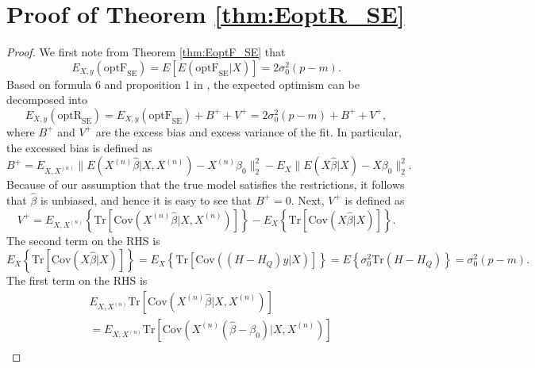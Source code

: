 \section{Proof of Theorem \ref{thm:EoptR_SE}}
\begin{proof}

We first note from Theorem \ref{thm:EoptF_SE} that
\begin{equation*}
E_{X,y}(\text{optF}_\text{SE}) = E \left[ E(\text{optF}_\text{SE} | X ) \right] = 2 \sigma_0^2(p-m).
\end{equation*}
Based on formula 6 and proposition 1 in , the expected optimism can be decomposed into 
\begin{equation*}
E_{X,y}(\text{optR}_\text{SE}) = E_{X,y}(\text{optF}_\text{SE}) + B^+ + V^+ = 2 \sigma_0^2(p-m) +  B^+ + V^+,
\end{equation*}
where $B^+$ and $V^+$ are the excess bias and excess variance of the fit. In particular, the excessed bias is defined as
\begin{equation*}
B^+ = E_{X,X^{(n)}} \big\lVert E( X^{(n)} \hat{\beta} \big | X, X^{(n)} ) - X^{(n)} \beta_0 \big\rVert_2^2 - E_X \big\lVert E( X \hat{\beta} \big | X ) - X \beta_0 \big\rVert_2^2.
\end{equation*}
Because of our assumption that the true model satisfies the restrictions, it follows that $\hat{\beta}$ is unbiased, and hence it is easy to see that $B^+=0$. Next, $V^+$ is defined as
\begin{equation*}
V^+ = E_{X,X^{(n)}} \left\{ \text{Tr} \left[ \text{Cov}\left( X^{(n)}\hat{\beta} \big | X, X^{(n)} \right) \right] \right\} - E_X \left\{ \text{Tr} \left[ \text{Cov}\left( X\hat{\beta} \big | X \right)  \right] \right\}.
\end{equation*}
The second term on the RHS is
\begin{equation*}
E_X \left\{  \text{Tr} \left[ \text{Cov} \left( X\hat{\beta} \big | X \right)  \right] \right\} = E_X \left\{ \text{Tr} \left[ \text{Cov} \left( (H-H_Q)y \big | X \right)  \right] \right\} = E\left\{  \sigma_0^2 \text{Tr} \left( H-H_Q  \right) \right\}= \sigma_0^2 (p-m).
\end{equation*}
The first term on the RHS is
\begin{equation*}
\begin{aligned}
& E_{X,X^{(n)}} \text{Tr} \left[ \text{Cov}\left( X^{(n)}\hat{\beta} \big | X, X^{(n)} \right) \right] \\
&= E_{X,X^{(n)}} \text{Tr} \left[ \text{Cov} \left( X^{(n)} (\hat{\beta} -\beta_0) \big | X, X^{(n)} \right) \right] \\

\end{aligned}
\end{equation*}
\end{proof}
